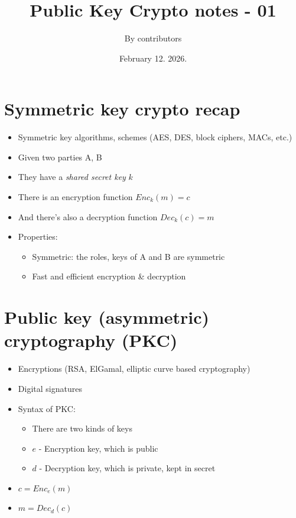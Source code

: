 \documentclass[11pt]{article}
\theoremstyle{definition}
\theoremstyle{proof}
\begin{document}
	
	\title{Public Key Crypto notes - 01}
	\date{February 12. 2026.}
	\author{By contributors}
	\maketitle
	
	\section{Symmetric key crypto recap}

	\begin{itemize}
		\item Symmetric key algorithms, schemes (AES, DES, block ciphers, MACs, etc.)
		\item Given two parties A, B
		\item They have a \emph{shared secret key} $k$
		\item There is an encryption function $Enc_k(m)=c$
		\item And there's also a decryption function $Dec_k(c)=m$
		\item Properties:
		\begin{itemize}
			\item Symmetric: the roles, keys of A and B are symmetric
			\item Fast and efficient encryption \& decryption
		\end{itemize}
	\end{itemize}
	
	\section{Public key (asymmetric) cryptography (PKC)}
	
	\begin{itemize}
		\item Encryptions (RSA, ElGamal, elliptic curve based cryptography)
		\item Digital signatures
		\item Syntax of PKC:
		\begin{itemize}
			\item There are two kinds of keys
			\item $e$ - Encryption key, which is public
			\item $d$ - Decryption key, which is private, kept in secret
		\end{itemize}
		\item $c = Enc_e(m)$
		\item $m = Dec_d(c)$
	\end{itemize}
	
\end{document}
